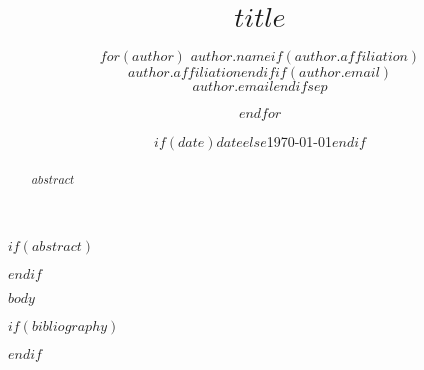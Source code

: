 \documentclass[10pt,a4paper]{article}
\title{\vspace{-2em}\Large\bfseries $title$}
\author{
$for(author)$
$author.name$$if(author.affiliation)$\\{\small $author.affiliation$}$endif$$if(author.email)$\\{\small\texttt{$author.email$}}$endif$$sep$ \and
$endfor$
}
\author{}
\date{$if(date)$$date$$else$\today$endif$}
\begin{document}
\maketitle
\vspace{-1em}

$if(abstract)$
\begin{abstract}
\noindent $abstract$
\end{abstract}
$endif$

$body$

$if(bibliography)$


$endif$
\end{document}

